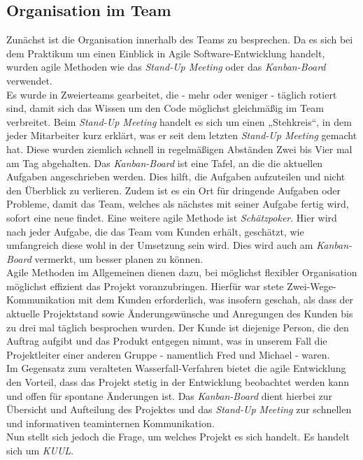 \documentclass[12pt,twoside]{article}
\theoremstyle{plain}
\theoremstyle{definition}
\theoremstyle{remark}
\begin{document}
\subsection{Organisation im Team}
\label{orga}
Zunächst ist die Organisation innerhalb des Teams zu besprechen.
Da es sich bei dem Praktikum um einen Einblick in Agile Software-Entwicklung handelt, wurden agile Methoden wie das \textit{Stand-Up Meeting} oder das \textit{Kanban-Board} verwendet.\\
Es wurde in Zweierteams gearbeitet, die - mehr oder weniger - täglich rotiert sind, damit sich das Wissen um den Code möglichst gleichmäßig im Team verbreitet.
Beim \textit{Stand-Up Meeting} handelt es sich um einen „Stehkreis“, in dem jeder Mitarbeiter kurz erklärt, was er seit dem letzten \textit{Stand-Up Meeting} gemacht hat. Diese wurden ziemlich schnell in regelmäßigen Abständen Zwei bis Vier mal am Tag abgehalten.
Das \textit{Kanban-Board} ist eine Tafel, an die die aktuellen Aufgaben angeschrieben werden. Dies hilft, die Aufgaben aufzuteilen und nicht den Überblick zu verlieren. Zudem ist es ein Ort für dringende Aufgaben oder Probleme, damit das Team, welches als nächstes mit seiner Aufgabe fertig wird, sofort eine neue findet.
Eine weitere agile Methode ist \textit{Schätzpoker}. Hier wird nach jeder Aufgabe, die das Team vom Kunden erhält, geschätzt, wie umfangreich diese wohl in der Umsetzung sein wird. Dies wird auch am \textit{Kanban-Board} vermerkt, um besser planen zu können.\\
Agile Methoden im Allgemeinen dienen dazu, bei möglichst flexibler Organisation möglichst effizient das Projekt voranzubringen.
Hierfür war stete Zwei-Wege-Kommunikation mit dem Kunden erforderlich, was insofern geschah, als dass der aktuelle Projektstand sowie Änderungswünsche und Anregungen des Kunden bis zu drei mal täglich besprochen wurden.
Der Kunde ist diejenige Person, die den Auftrag aufgibt und das Produkt entgegen nimmt, was in unserem Fall die Projektleiter einer anderen Gruppe - namentlich Fred und Michael - waren.\\
Im Gegensatz zum veralteten Wasserfall-Verfahren bietet die agile Entwicklung den Vorteil, dass das Projekt stetig in der Entwicklung beobachtet werden kann und offen für spontane Änderungen ist.
Das \textit{Kanban-Board} dient hierbei zur Übersicht und Aufteilung des Projektes und das \textit{Stand-Up Meeting} zur schnellen und informativen teaminternen Kommunikation.\\
Nun stellt sich jedoch die Frage, um welches Projekt es sich handelt. Es handelt sich um \textit{KUUL}.
\end{document}
